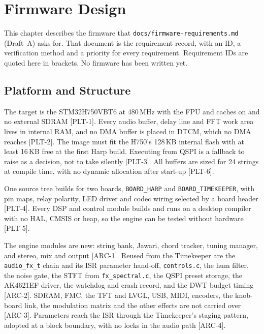 \chapter{Firmware Design}\label{ch:firmware}

This chapter describes the firmware that \texttt{docs/firmware-requirements.md} (Draft~A) asks for. That document is the requirement record, with an ID, a verification method and a priority for every requirement. Requirement IDs are quoted here in brackets. No firmware has been written yet.

\section{Platform and Structure}
The target is the STM32H750VBT6 at 480\,MHz with the FPU and caches on and no external SDRAM [PLT-1]. Every audio buffer, delay line and FFT work area lives in internal RAM, and no DMA buffer is placed in DTCM, which no DMA reaches [PLT-2]. The image must fit the H750's 128\,KB internal flash with at least 16\,KB free at the first Harp build. Executing from QSPI is a fallback to raise as a decision, not to take silently [PLT-3]. All buffers are sized for 24 strings at compile time, with no dynamic allocation after start-up [PLT-6].

One source tree builds for two boards, \texttt{BOARD\_HARP} and \texttt{BOARD\_TIMEKEEPER}, with pin maps, relay polarity, LED driver and codec wiring selected by a board header [PLT-4]. Every DSP and control module builds and runs on a desktop compiler with no HAL, CMSIS or heap, so the engine can be tested without hardware [PLT-5].

The engine modules are new: string bank, Jawari, chord tracker, tuning manager, and stereo, mix and output [ARC-1]. Reused from the Timekeeper are the \texttt{audio\_fx\_t} chain and its ISR parameter hand-off, \texttt{controls.c}, the hum filter, the noise gate, the STFT from \texttt{fx\_spectral.c}, the QSPI preset storage, the AK4621EF driver, the watchdog and crash record, and the DWT budget timing [ARC-2]. SDRAM, FMC, the TFT and LVGL, USB, MIDI, encoders, the knob-board link, the modulation matrix and the other effects are not carried over [ARC-3]. Parameters reach the ISR through the Timekeeper's staging pattern, adopted at a block boundary, with no locks in the audio path [ARC-4].

